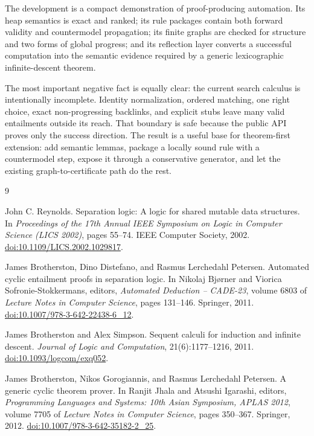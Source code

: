 \documentclass[11pt,oneside]{book}
\DeclareRobustCommand{\code}[1]{\texttt{\detokenize{#1}}}
\DeclareRobustCommand{\file}[1]{\texttt{\detokenize{#1}}}
\begin{document}
The \file{SP} development is a compact demonstration of proof-producing
automation.  Its heap semantics is exact and ranked; its rule packages contain
both forward validity and countermodel propagation; its finite graphs are
checked for structure and two forms of global progress; and its reflection
layer converts a successful computation into the semantic evidence required by
a generic lexicographic infinite-descent theorem.

The most important negative fact is equally clear: the current search calculus
is intentionally incomplete.  Identity normalization, ordered matching, one
right choice, exact non-progressing backlinks, and explicit \code{None} stubs
leave many valid entailments outside its reach.  That boundary is safe because
the public API proves only the success direction.  The result is a useful base
for theorem-first extension: add semantic lemmas, package a locally sound rule
with a countermodel step, expose it through a conservative generator, and let
the existing graph-to-certificate path do the rest.

\begin{thebibliography}{9}

John C. Reynolds.
\newblock Separation logic: A logic for shared mutable data structures.
\newblock In \emph{Proceedings of the 17th Annual IEEE Symposium on Logic in
Computer Science (LICS 2002)}, pages 55--74. IEEE Computer Society, 2002.
\newblock \href{https://doi.org/10.1109/LICS.2002.1029817}%
{doi:10.1109/LICS.2002.1029817}.

James Brotherston, Dino Distefano, and Rasmus Lerchedahl Petersen.
\newblock Automated cyclic entailment proofs in separation logic.
\newblock In Nikolaj Bj{\o}rner and Viorica Sofronie-Stokkermans, editors,
\emph{Automated Deduction -- CADE-23}, volume 6803 of \emph{Lecture Notes in
Computer Science}, pages 131--146. Springer, 2011.
\newblock \href{https://doi.org/10.1007/978-3-642-22438-6_12}%
{doi:10.1007/978-3-642-22438-6\_12}.

James Brotherston and Alex Simpson.
\newblock Sequent calculi for induction and infinite descent.
\newblock \emph{Journal of Logic and Computation}, 21(6):1177--1216, 2011.
\newblock \href{https://doi.org/10.1093/logcom/exq052}%
{doi:10.1093/logcom/exq052}.

James Brotherston, Nikos Gorogiannis, and Rasmus Lerchedahl Petersen.
\newblock A generic cyclic theorem prover.
\newblock In Ranjit Jhala and Atsushi Igarashi, editors,
\emph{Programming Languages and Systems: 10th Asian Symposium, APLAS 2012},
volume 7705 of \emph{Lecture Notes in Computer Science}, pages 350--367.
Springer, 2012.
\newblock \href{https://doi.org/10.1007/978-3-642-35182-2_25}%
{doi:10.1007/978-3-642-35182-2\_25}.

\end{thebibliography}
\end{document}
